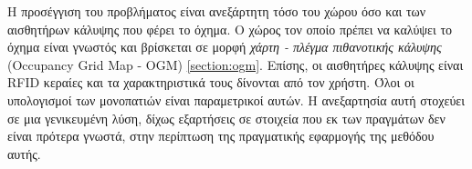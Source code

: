 Η προσέγγιση του προβλήματος είναι ανεξάρτητη τόσο του χώρου όσο και των αισθητήρων κάλυψης που φέρει το όχημα. Ο χώρος τον οποίο πρέπει να καλύψει το όχημα είναι γνωστός και βρίσκεται σε μορφή \emph{χάρτη - πλέγμα πιθανοτικής κάλυψης} (Occupancy Grid Map - OGM) \ref{section:ogm}. Επίσης, οι αισθητήρες κάλυψης είναι RFID κεραίες και τα χαρακτηριστικά τους δίνονται από τον χρήστη. Όλοι οι υπολογισμοί των μονοπατιών είναι παραμετρικοί αυτών. Η ανεξαρτησία αυτή στοχεύει σε μια γενικευμένη λύση, δίχως εξαρτήσεις σε στοιχεία που εκ των πραγμάτων δεν είναι πρότερα γνωστά, στην περίπτωση της πραγματικής εφαρμογής της μεθόδου αυτής.

